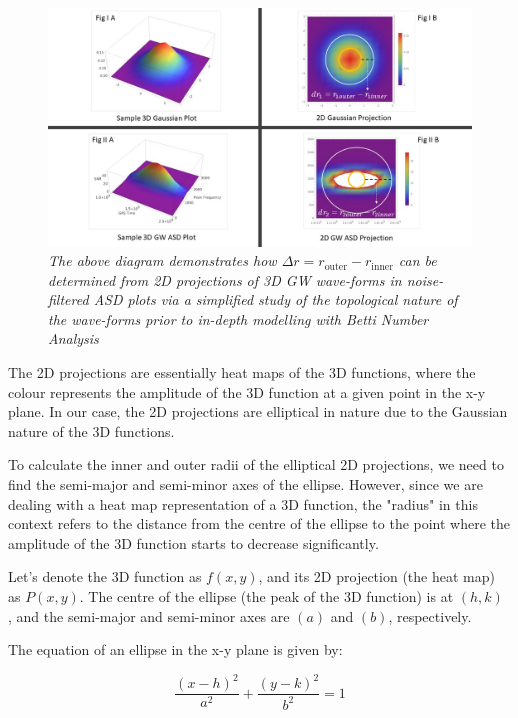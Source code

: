  \begin{figure}[H]
        \centering
        \includegraphics[width=1.0\linewidth]{images/80_WaveFunction Topology.jpg}
        \caption{\textit{The above diagram demonstrates how $\Delta r = r_{\text{outer}} - r_{\text{inner}}$ can be determined from 2D projections of 3D GW wave-forms in noise-filtered ASD plots via a simplified study of the topological nature of the wave-forms prior to in-depth modelling with Betti Number Analysis}}
        \label{fig:2D_Phase_Space_Projections}
    \end{figure}

The 2D projections are essentially heat maps of the 3D functions, where the colour represents the amplitude of the 3D function at a given point in the x-y plane. In our case, the 2D projections are elliptical in nature due to the Gaussian nature of the 3D functions.

To calculate the inner and outer radii of the elliptical 2D projections, we need to find the semi-major and semi-minor axes of the ellipse. However, since we are dealing with a heat map representation of a 3D function, the "radius" in this context refers to the distance from the centre of the ellipse to the point where the amplitude of the 3D function starts to decrease significantly.

Let's denote the 3D function as $f(x, y)$, and its 2D projection (the heat map) as $P(x, y)$. The centre of the ellipse (the peak of the 3D function) is at $(h, k)$ , and the semi-major and semi-minor axes are $(a)$ and $(b)$, respectively.

The equation of an ellipse in the x-y plane is given by:

\begin{equation}
\frac{(x-h)^2}{a^2} + \frac{(y-k)^2}{b^2} = 1
\end{equation}


